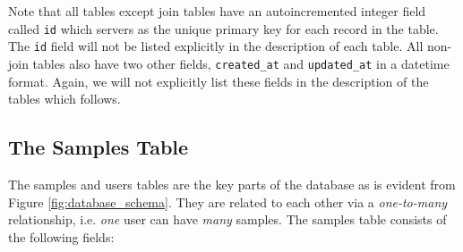 \documentclass[12pt]{article}
\begin{document}
Note that all tables except join tables have an autoincremented integer field
called \verb=id= which servers as the unique primary key for each record
in the table. The \verb=id= field will not be listed explicitly in the
description of each table. All non-join tables also have two other
fields, \verb=created_at= and \verb=updated_at= in a datetime format.
Again, we will not explicitly list these fields in the description
of the tables which follows.

\subsection{The Samples Table}
The samples and users tables are the key parts of the database as is
evident from Figure \ref{fig:database_schema}. They are related to each
other via a \emph{one-to-many} relationship, i.e. \emph{one} user
can have \emph{many} samples. The samples table
consists of the following fields:
\end{document}
